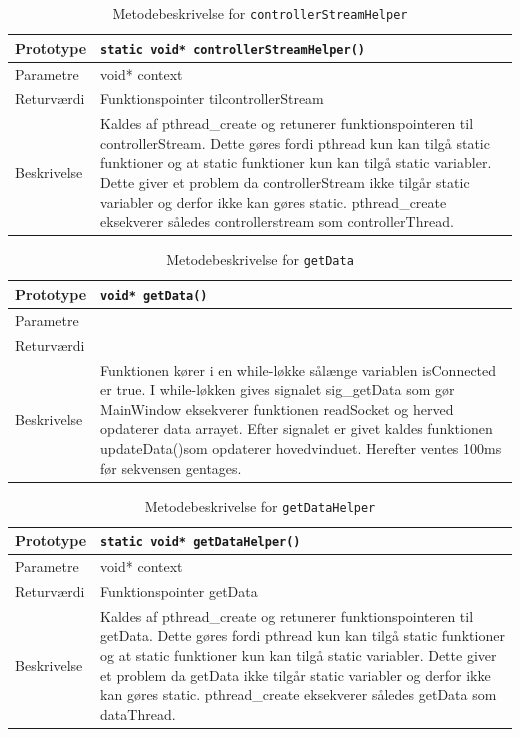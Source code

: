 \begin{table}[H]
\begin{tabularx}{\textwidth}{| L{2.5 cm} | Z |} \hline
Prototype & \texttt{static void* controllerStreamHelper()} \\\hline
Parametre & void* context  \\\hline
Returværdi & Funktionspointer tilcontrollerStream  \\\hline
Beskrivelse & Kaldes af pthread\_create og retunerer funktionspointeren til controllerStream. Dette gøres fordi pthread kun kan tilgå static funktioner og at static funktioner kun kan tilgå static variabler. Dette giver et problem da controllerStream ikke tilgår static variabler og derfor ikke kan gøres static. pthread\_create eksekverer således controllerstream som controllerThread.\\\hline
\end{tabularx}
\caption{Metodebeskrivelse for \texttt{controllerStreamHelper}}
\label{table:met_controllerStreamHelper}
\end{table}

\begin{table}[H]
\begin{tabularx}{\textwidth}{| L{2.5 cm} | Z |} \hline
Prototype & \texttt{void* getData()} \\\hline
Parametre &   \\\hline
Returværdi &  \\\hline
Beskrivelse & Funktionen kører i en while-løkke sålænge variablen isConnected er true. I while-løkken gives signalet sig\_getData som gør MainWindow eksekverer funktionen readSocket og herved opdaterer data arrayet. Efter signalet er givet kaldes funktionen updateData()som opdaterer hovedvinduet. Herefter ventes 100ms før sekvensen gentages.  \\\hline
\end{tabularx}
\caption{Metodebeskrivelse for \texttt{getData}}
\label{table:met_getData}
\end{table}

\begin{table}[H]
\begin{tabularx}{\textwidth}{| L{2.5 cm} | Z |} \hline
Prototype & \texttt{static void* getDataHelper()} \\\hline
Parametre & void* context  \\\hline
Returværdi & Funktionspointer getData  \\\hline
Beskrivelse & Kaldes af pthread\_create og retunerer funktionspointeren til getData. Dette gøres fordi pthread kun kan tilgå static funktioner og at static funktioner kun kan tilgå static variabler. Dette giver et problem da getData ikke tilgår static variabler og derfor ikke kan gøres static. pthread\_create eksekverer således getData som dataThread.\\\hline
\end{tabularx}
\caption{Metodebeskrivelse for \texttt{getDataHelper}}
\label{table:met_getDataHelper}
\end{table}

